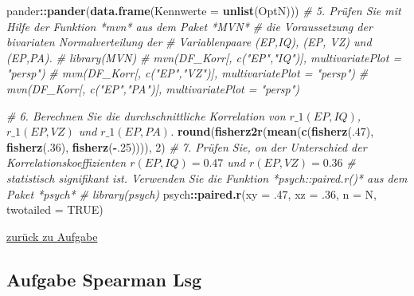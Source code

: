 \documentclass[
]{article}
\newenvironment{Shaded}{\begin{snugshade}}{\end{snugshade}}
\newcommand{\AttributeTok}[1]{\textcolor[rgb]{0.13,0.29,0.53}{#1}}
\newcommand{\CommentTok}[1]{\textcolor[rgb]{0.56,0.35,0.01}{\textit{#1}}}
\newcommand{\ConstantTok}[1]{\textcolor[rgb]{0.56,0.35,0.01}{#1}}
\newcommand{\DecValTok}[1]{\textcolor[rgb]{0.00,0.00,0.81}{#1}}
\newcommand{\FunctionTok}[1]{\textcolor[rgb]{0.13,0.29,0.53}{\textbf{#1}}}
\newcommand{\NormalTok}[1]{#1}
\newcommand{\SpecialCharTok}[1]{\textcolor[rgb]{0.81,0.36,0.00}{\textbf{#1}}}
\begin{document}
\begin{Shaded}
\begin{Highlighting}[]
\NormalTok{    pander}\SpecialCharTok{::}\FunctionTok{pander}\NormalTok{(}\FunctionTok{data.frame}\NormalTok{(}\AttributeTok{Kennwerte =} \FunctionTok{unlist}\NormalTok{(OptN)))}
  \CommentTok{\# 5. Prüfen Sie mit Hilfe der Funktion *mvn* aus dem Paket *MVN* }
  \CommentTok{\#    die Voraussetzung der bivariaten Normalverteilung der }
  \CommentTok{\#    Variablenpaare (EP,IQ), (EP, VZ) und (EP,PA).}
    \CommentTok{\# library(MVN)}
    \CommentTok{\# mvn(DF\_Korr[, c("EP","IQ")], multivariatePlot = "persp")}
    \CommentTok{\# mvn(DF\_Korr[, c("EP","VZ")], multivariatePlot = "persp")}
    \CommentTok{\# mvn(DF\_Korr[, c("EP","PA")], multivariatePlot = "persp")}

  \CommentTok{\# 6. Berechnen Sie die durchschnittliche Korrelation von $r\_1(EP,IQ)$, $r\_1(EP,VZ)$ und $r\_1(EP,PA)$.}
      \FunctionTok{round}\NormalTok{(}\FunctionTok{fisherz2r}\NormalTok{(}\FunctionTok{mean}\NormalTok{(}\FunctionTok{c}\NormalTok{(}\FunctionTok{fisherz}\NormalTok{(.}\DecValTok{47}\NormalTok{), }\FunctionTok{fisherz}\NormalTok{(.}\DecValTok{36}\NormalTok{), }\FunctionTok{fisherz}\NormalTok{(}\SpecialCharTok{{-}}\NormalTok{.}\DecValTok{25}\NormalTok{)))), }\DecValTok{2}\NormalTok{)}
  \CommentTok{\# 7. Prüfen Sie, on der Unterschied der Korrelationskoeffizienten $r(EP,IQ) = 0.47$ und $r(EP,VZ) = 0.36$}
  \CommentTok{\#    statistisch signifikant ist. Verwenden Sie die Funktion *psych::paired.r()* aus dem Paket *psych*}
    \CommentTok{\# library(psych)}
\NormalTok{    psych}\SpecialCharTok{::}\FunctionTok{paired.r}\NormalTok{(}\AttributeTok{xy        =}\NormalTok{ .}\DecValTok{47}\NormalTok{, }
             \AttributeTok{xz        =}\NormalTok{ .}\DecValTok{36}\NormalTok{, }
             \AttributeTok{n         =}\NormalTok{ N,}
             \AttributeTok{twotailed =} \ConstantTok{TRUE}\NormalTok{) }
\end{Highlighting}
\end{Shaded}

\hyperref[aufgabe-korrelation]{zurück zu Aufgabe}

\subsection*{Aufgabe Spearman Lsg}\label{aufgabe-spearman-lsg}
\end{document}

